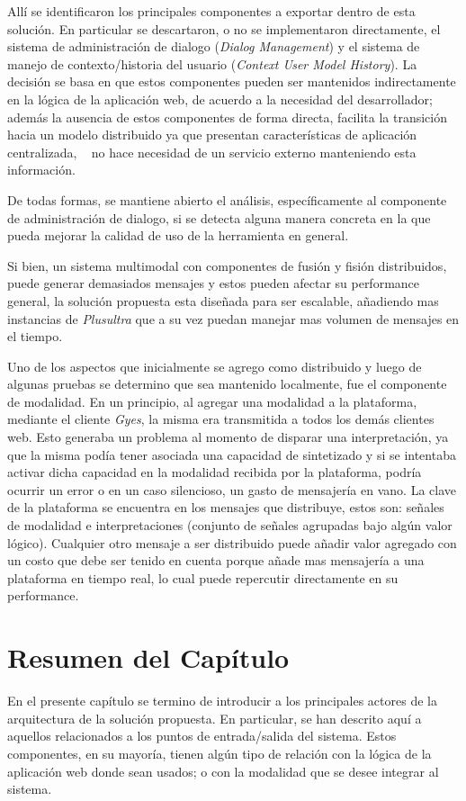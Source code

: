Allí se identificaron los principales componentes a exportar dentro de esta solución. En particular se descartaron, o no se implementaron directamente, el sistema de administración de dialogo (\emph{Dialog Management}) y el sistema de manejo de contexto/historia del usuario (\emph{Context User Model History}). La decisión se basa en que estos componentes pueden ser mantenidos indirectamente en la lógica de la aplicación web, de acuerdo a la necesidad del desarrollador; además la ausencia de estos componentes de forma directa, facilita la transición hacia un modelo distribuido ya que presentan características de aplicación centralizada, \ie~ no hace necesidad de un servicio externo manteniendo esta información.

De todas formas, se mantiene abierto el análisis, específicamente al componente de administración de dialogo, si se detecta alguna manera concreta en la que pueda mejorar la calidad de uso de la herramienta en general.

Si bien, un sistema multimodal con componentes de fusión y fisión distribuidos, puede generar demasiados mensajes y estos pueden afectar su performance general, la solución propuesta esta diseñada para ser escalable, añadiendo mas instancias de \emph{Plusultra} que a su vez puedan manejar mas volumen de mensajes en el tiempo. 

Uno de los aspectos que inicialmente se agrego como distribuido y luego de algunas pruebas se determino que sea mantenido localmente, fue el componente de modalidad. En un principio, al agregar una modalidad a la plataforma, mediante el cliente \emph{Gyes}, la misma era transmitida a todos los demás clientes web. Esto generaba un problema al momento de disparar una interpretación, ya que la misma podía tener asociada una capacidad de sintetizado y si se intentaba activar dicha capacidad en la modalidad recibida por la plataforma, podría ocurrir un error o en un caso silencioso, un gasto de mensajería en vano.
La clave de la plataforma se encuentra en los mensajes que distribuye, estos son: señales de modalidad e interpretaciones (conjunto de señales agrupadas bajo algún valor lógico). Cualquier otro mensaje a ser distribuido puede añadir valor agregado con un costo que debe ser tenido en cuenta porque añade mas mensajería a una plataforma en tiempo real, lo cual puede repercutir directamente en su performance. 

\section{Resumen del Capítulo} \label{sec:enlace_summary}
En el presente capítulo se termino de introducir a los principales actores de la arquitectura de la solución propuesta. En particular, se han descrito aquí a aquellos relacionados a los puntos de entrada/salida del sistema. Estos componentes, en su mayoría, tienen algún tipo de relación con la lógica de la aplicación web donde sean usados; o con la modalidad que se desee integrar al sistema. 

